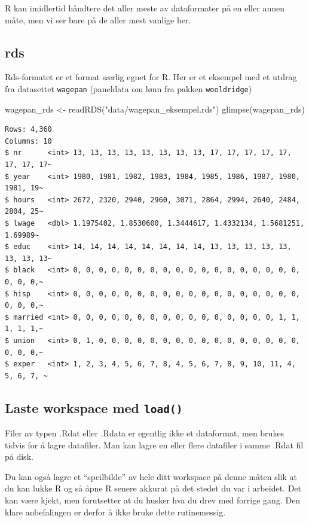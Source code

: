 \documentclass[
  norsk,
  letterpaper,
  DIV=11,
  numbers=noendperiod]{scrreprt}
\newenvironment{Shaded}{\begin{snugshade}}{\end{snugshade}}
\newcommand{\FunctionTok}[1]{\textcolor[rgb]{0.28,0.35,0.67}{#1}}
\newcommand{\NormalTok}[1]{\textcolor[rgb]{0.00,0.23,0.31}{#1}}
\newcommand{\OtherTok}[1]{\textcolor[rgb]{0.00,0.23,0.31}{#1}}
\newcommand{\StringTok}[1]{\textcolor[rgb]{0.13,0.47,0.30}{#1}}
\theoremstyle{definition}
\theoremstyle{remark}
\begin{document}
R kan imidlertid håndtere det aller meste av dataformater på en eller
annen måte, men vi ser bare på de aller mest vanlige her.

\subsection{rds}\label{rds}

Rds-formatet er et format særlig egnet for R. Her er et eksempel med et
utdrag fra datasettet \texttt{wagepan} (paneldata om lønn fra pakken
\texttt{wooldridge})

\begin{Shaded}
\begin{Highlighting}[]
\NormalTok{wagepan\_rds }\OtherTok{\textless{}{-}} \FunctionTok{readRDS}\NormalTok{(}\StringTok{"data/wagepan\_eksempel.rds"}\NormalTok{)}
\FunctionTok{glimpse}\NormalTok{(wagepan\_rds)}
\end{Highlighting}
\end{Shaded}

\begin{verbatim}
Rows: 4,360
Columns: 10
$ nr      <int> 13, 13, 13, 13, 13, 13, 13, 13, 17, 17, 17, 17, 17, 17, 17, 17~
$ year    <int> 1980, 1981, 1982, 1983, 1984, 1985, 1986, 1987, 1980, 1981, 19~
$ hours   <int> 2672, 2320, 2940, 2960, 3071, 2864, 2994, 2640, 2484, 2804, 25~
$ lwage   <dbl> 1.1975402, 1.8530600, 1.3444617, 1.4332134, 1.5681251, 1.69989~
$ educ    <int> 14, 14, 14, 14, 14, 14, 14, 14, 13, 13, 13, 13, 13, 13, 13, 13~
$ black   <int> 0, 0, 0, 0, 0, 0, 0, 0, 0, 0, 0, 0, 0, 0, 0, 0, 0, 0, 0, 0, 0,~
$ hisp    <int> 0, 0, 0, 0, 0, 0, 0, 0, 0, 0, 0, 0, 0, 0, 0, 0, 0, 0, 0, 0, 0,~
$ married <int> 0, 0, 0, 0, 0, 0, 0, 0, 0, 0, 0, 0, 0, 0, 0, 0, 1, 1, 1, 1, 1,~
$ union   <int> 0, 1, 0, 0, 0, 0, 0, 0, 0, 0, 0, 0, 0, 0, 0, 0, 0, 0, 0, 0, 0,~
$ exper   <int> 1, 2, 3, 4, 5, 6, 7, 8, 4, 5, 6, 7, 8, 9, 10, 11, 4, 5, 6, 7, ~
\end{verbatim}

\subsection{\texorpdfstring{Laste workspace med
\texttt{load()}}{Laste workspace med load()}}\label{laste-workspace-med-load}

Filer av typen .Rdat eller .Rdata er egentlig ikke et dataformat, men
brukes tidvis for å lagre datafiler. Man kan lagre en eller flere
datafiler i samme .Rdat fil på disk.

Du kan også lagre et ``speilbilde'' av hele ditt workspace på denne
måten slik at du kan lukke R og så åpne R senere akkurat på det stedet
du var i arbeidet. Det kan være kjekt, men forutsetter at du husker hva
du drev med forrige gang. Den klare anbefalingen er derfor å ikke bruke
dette rutinemessig.
\end{document}
